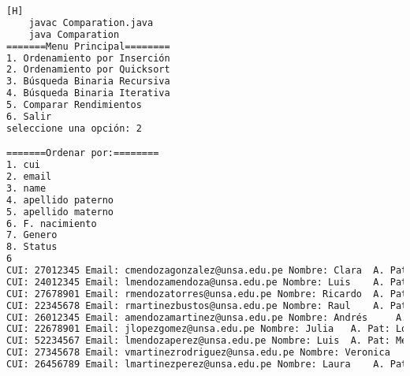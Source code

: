    	\begin{lstlisting}[language=bash,caption={Compilación y ejecución del código}][H]
    javac Comparation.java
    java Comparation
=======Menu Principal========
1. Ordenamiento por Inserción
2. Ordenamiento por Quicksort
3. Búsqueda Binaria Recursiva
4. Búsqueda Binaria Iterativa
5. Comparar Rendimientos
6. Salir
seleccione una opción: 2

=======Ordenar por:========
1. cui
2. email
3. name
4. apellido paterno
5. apellido materno
6. F. nacimiento
7. Genero
8. Status
6
CUI: 27012345 Email: cmendozagonzalez@unsa.edu.pe Nombre: Clara	 A. Pat: Mendoza A. Mat: Gonzalez Fecha de Nacimiento: 1986-12-21 Genero: 0 Estado: 0
CUI: 24012345 Email: lmendozamendoza@unsa.edu.pe Nombre: Luis	 A. Pat: Mendoza A. Mat: Mendoza Fecha de Nacimiento: 1987-01-09 Genero: 1 Estado: 0
CUI: 27678901 Email: rmendozatorres@unsa.edu.pe Nombre: Ricardo	 A. Pat: Mendoza A. Mat: Torres Fecha de Nacimiento: 1988-08-03 Genero: 1 Estado: 1
CUI: 22345678 Email: rmartinezbustos@unsa.edu.pe Nombre: Raul	 A. Pat: Martinez A. Mat: Bustos Fecha de Nacimiento: 1988-10-30 Genero: 1 Estado: 1
CUI: 26012345 Email: amendozamartinez@unsa.edu.pe Nombre: Andrés	 A. Pat: Mendoza A. Mat: Martinez Fecha de Nacimiento: 1989-11-08 Genero: 1 Estado: 1
CUI: 22678901 Email: jlopezgomez@unsa.edu.pe Nombre: Julia	 A. Pat: Lopez A. Mat: Gomez Fecha de Nacimiento: 1990-03-07 Genero: 0 Estado: 0
CUI: 52234567 Email: lmendozaperez@unsa.edu.pe Nombre: Luis	 A. Pat: Mendoza A. Mat: Perez Fecha de Nacimiento: 1990-04-03 Genero: 0 Estado: 1
CUI: 27345678 Email: vmartinezrodriguez@unsa.edu.pe Nombre: Veronica	 A. Pat: Martinez A. Mat: Rodriguez Fecha de Nacimiento: 1990-05-26 Genero: 0 Estado: 1
CUI: 26456789 Email: lmartinezperez@unsa.edu.pe Nombre: Laura	 A. Pat: Martinez A. Mat: Perez Fecha de Nacimiento: 1990-07-24 Genero: 0 Estado: 1

  \end{lstlisting}

